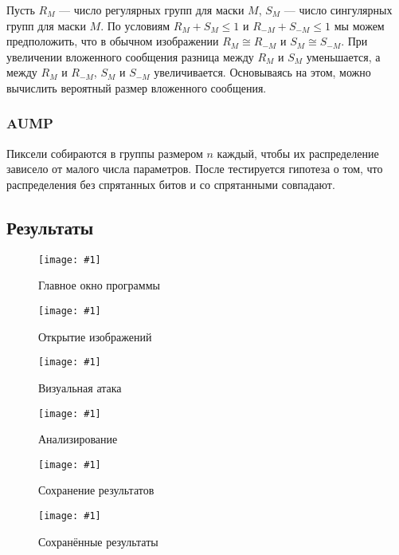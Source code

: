 \documentclass[12pt, a4paper, english, russian]{article}
\newcommand{\pic}[2]{
	\begin{figure}[H]
		\centering
		\texttt{[image: \#1]}
		\caption{#2}
	\end{figure}
}
\begin{document}
Пусть $R_M$ --- число регулярных групп для маски $M$, $S_M$ --- число сингулярных
групп для маски $M$. По условиям $R_M + S_M \leq 1$ и $R_{-M} + S_{-M} \leq 1$
мы можем предположить, что в обычном изображении $R_M \cong R_{-M}$ и $S_M \cong S_{-M}$.
При увеличении вложенного сообщения разница между $R_M$ и $S_M$ уменьшается,
а между $R_M$ и $R_{-M}$, $S_M$ и $S_{-M}$ увеличивается. Основываясь на этом,
можно вычислить вероятный размер вложенного сообщения.

\subsubsection{AUMP}
Пиксели собираются в группы размером $n$ каждый, чтобы их распределение
зависело от малого числа параметров.
После тестируется гипотеза о том, что распределения без спрятанных битов
и со спрятанными совпадают.

\pagebreak

\subsection{Результаты}
\pic{images/app.png}{Главное окно программы}
\pic{images/opening_images.png}{Открытие изображений}
\pic{images/attack_images.png}{Визуальная атака}
\pic{images/analysis.png}{Анализирование}
\pic{images/saving.png}{Сохранение результатов}
\pic{images/saves.png}{Сохранённые результаты}
\end{document}
